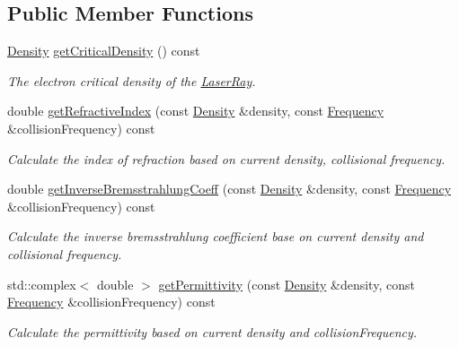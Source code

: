 \subsection*{Public Member Functions}
\begin{DoxyCompactItemize}
\item 
\mbox{\label{structraytracer_1_1physics_1_1LaserRay_abd3a438ada8ed1b8c8c6a67507fa99e1}} 
\hyperlink{structraytracer_1_1physics_1_1Density}{Density} \hyperlink{structraytracer_1_1physics_1_1LaserRay_abd3a438ada8ed1b8c8c6a67507fa99e1}{get\+Critical\+Density} () const
\begin{DoxyCompactList}\small\item\em The electron critical density of the \hyperlink{structraytracer_1_1physics_1_1LaserRay}{Laser\+Ray}. \end{DoxyCompactList}\item 
double \hyperlink{structraytracer_1_1physics_1_1LaserRay_ae17f1eba8f0f91cb5960a865aacb9849}{get\+Refractive\+Index} (const \hyperlink{structraytracer_1_1physics_1_1Density}{Density} \&density, const \hyperlink{structraytracer_1_1physics_1_1Frequency}{Frequency} \&collision\+Frequency) const
\begin{DoxyCompactList}\small\item\em Calculate the index of refraction based on current density, collisional frequency. \end{DoxyCompactList}\item 
double \hyperlink{structraytracer_1_1physics_1_1LaserRay_adaba8f65ba15512c6022f5eb55a3a41a}{get\+Inverse\+Bremsstrahlung\+Coeff} (const \hyperlink{structraytracer_1_1physics_1_1Density}{Density} \&density, const \hyperlink{structraytracer_1_1physics_1_1Frequency}{Frequency} \&collision\+Frequency) const
\begin{DoxyCompactList}\small\item\em Calculate the inverse bremsstrahlung coefficient base on current density and collisional frequency. \end{DoxyCompactList}\item 
std\+::complex$<$ double $>$ \hyperlink{structraytracer_1_1physics_1_1LaserRay_a2a033aeed48df8c008c221545e7a93a2}{get\+Permittivity} (const \hyperlink{structraytracer_1_1physics_1_1Density}{Density} \&density, const \hyperlink{structraytracer_1_1physics_1_1Frequency}{Frequency} \&collision\+Frequency) const
\begin{DoxyCompactList}\small\item\em Calculate the permittivity based on current density and collision\+Frequency. \end{DoxyCompactList}\item 

\end{DoxyCompactItemize}
